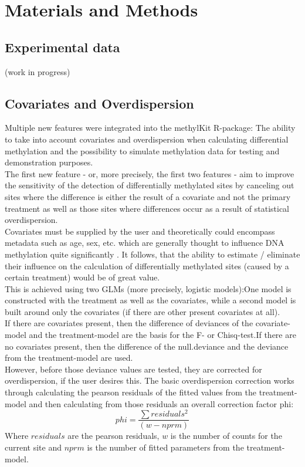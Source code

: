 \section{Materials and Methods}
\subsection{Experimental data}

(work in progress)

\subsection{Covariates and Overdispersion}

Multiple new features were integrated into the methylKit R-package: The ability to take into account covariates and overdispersion when calculating differential methylation and the possibility to simulate methylation data for testing and demonstration purposes.\\
The first new feature - or, more precisely, the first two features - aim to  improve the sensitivity of the detection of differentially methylated sites by canceling out sites where the difference is either the result of a covariate and not the primary treatment as well as those sites where differences occur as a result of statistical overdispersion.\\
Covariates must be supplied by the user and theoretically could encompass metadata such as age, sex, etc. which are generally thought to influence DNA methylation quite significantly \cite{24561809}. It follows, that the ability to estimate / eliminate their influence on the calculation of differentially methylated sites (caused by a certain treatment) would be of great value.\\
This is achieved using two GLMs (more precisely, logistic models):One model is constructed with the treatment as well as the covariates, while a second model is built around only the covariates (if there are other present covariates at all).\\
If there are covariates present, then the difference of deviances of the covariate-model and the treatment-model are the basis for the F- or Chisq-test.If there are no covariates present, then the difference of the null.deviance and the deviance from the treatment-model are used.\\
However, before those deviance values are tested, they are corrected for overdispersion, if the user desires this. The basic overdispersion correction works through calculating the pearson residuals of the fitted values from the treatment-model and then calculating from those residuals an overall correction factor phi:
\[phi = \frac{\sum{residuals^2}}{(w - nprm)}\]
Where $residuals$ are the pearson residuals, $w$ is the number of counts for the current site and $nprm$ is the number of fitted parameters from the treatment-model.

